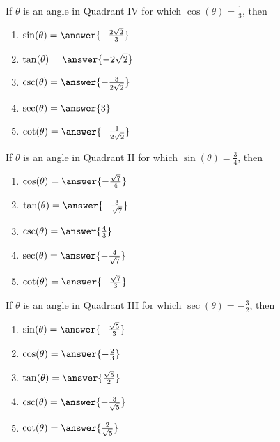 \documentclass{ximera}
\author{Kenneth Berglund}
\begin{document}
\begin{exercise}

  If $\theta$ is an angle in Quadrant IV for which $\cos(\theta)=\frac{1}{3}$, then 

	\begin{enumerate}
		\item $\sin(\theta) = \answer{-\frac{2\sqrt{2}}{3}}$
		\item $\tan(\theta) = \answer{-2\sqrt{2}}$
		\item $\csc(\theta) = \answer{-\frac{3}{2\sqrt{2}}}$
		\item $\sec(\theta) = \answer{3}$
		\item $\cot(\theta) = \answer{-\frac{1}{2\sqrt{2}}}$
	\end{enumerate}

\end{exercise}

\begin{exercise}

  If $\theta$ is an angle in Quadrant II for which $\sin(\theta)=\frac{3}{4}$, then 

	\begin{enumerate}
		\item $\cos(\theta) = \answer{-\frac{\sqrt{7}}{4}}$
		\item $\tan(\theta) = \answer{-\frac{3}{\sqrt{7}}}$
		\item $\csc(\theta) = \answer{\frac{4}{3}}$
		\item $\sec(\theta) = \answer{-\frac{4}{\sqrt{7}}}$
		\item $\cot(\theta) = \answer{-\frac{\sqrt{7}}{3}}$
	\end{enumerate}

\end{exercise}

\begin{exercise}

  If $\theta$ is an angle in Quadrant III for which $\sec(\theta)=-\frac{3}{2}$, then 

	\begin{enumerate}
		\item $\sin(\theta) = \answer{-\frac{\sqrt{5}}{3}}$
		\item $\cos(\theta) = \answer{-\frac{2}{3}}$
		\item $\tan(\theta) = \answer{\frac{\sqrt{5}}{2}}$
		\item $\csc(\theta) = \answer{-\frac{3}{\sqrt{5}}}$
		\item $\cot(\theta) = \answer{\frac{2}{\sqrt{5}}}$
	\end{enumerate}

\end{exercise}
\end{document}
